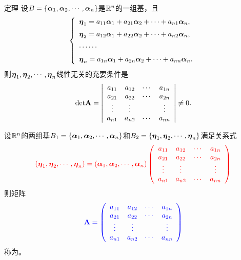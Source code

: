 \begin{frame}
  \begin{footnotesize}
    \begin{block}{定理}
      设$B=\{\boldsymbol{\alpha}_1,\boldsymbol{\alpha}_2,\cdots,\boldsymbol{\alpha}_n\}$是$\mathbb{R}^n$的一组基，且
      $$
      \left\{
      \begin{array}{l}
        \boldsymbol{\eta}_1=a_{11}\boldsymbol{\alpha}_1+a_{21}\boldsymbol{\alpha}_2+\cdots+a_{n1}\boldsymbol{\alpha}_n,\\[0.2cm]
        \boldsymbol{\eta}_2=a_{12}\boldsymbol{\alpha}_1+a_{22}\boldsymbol{\alpha}_2+\cdots+a_{n2}\boldsymbol{\alpha}_n,\\[0.2cm]
        \cdots\cdots\\[0.2cm]
        \boldsymbol{\eta}_n=a_{1n}\boldsymbol{\alpha}_1+a_{2n}\boldsymbol{\alpha}_2+\cdots+a_{nn}\boldsymbol{\alpha}_n.
      \end{array}
      \right.
      $$
      则$\boldsymbol{\eta}_1,\boldsymbol{\eta}_2,\cdots,\boldsymbol{\eta}_n$线性无关的充要条件是
      $$
      \mathrm{det}\mathbf{A}=\left|
      \begin{array}{cccc}
        a_{11}&a_{12}&\cdots&a_{1n}\\
        a_{21}&a_{22}&\cdots&a_{2n}\\
        \vdots&\vdots&&\vdots\\
        a_{n1}&a_{n2}&\cdots&a_{nn}
      \end{array}
      \right|\ne 0.
      $$
    \end{block}
  \end{footnotesize}
\end{frame}


\begin{frame}
  \begin{footnotesize}
    设$\mathbb{R}^n$的两组基$B_1=\{\boldsymbol{\alpha}_1,\boldsymbol{\alpha}_2,\cdots,\boldsymbol{\alpha}_n\}$和$B_2=\{\boldsymbol{\eta}_1,\boldsymbol{\eta}_2,\cdots,\boldsymbol{\eta}_n\}$满足关系式
    $$\textcolor{red}{
    (\boldsymbol{\eta}_1,\boldsymbol{\eta}_2,\cdots,\boldsymbol{\eta}_n)=(\boldsymbol{\alpha}_1,\boldsymbol{\alpha}_2,\cdots,\boldsymbol{\alpha}_n)\left(
    \begin{array}{cccc}
      a_{11}&a_{12}&\cdots&a_{1n}\\
      a_{21}&a_{22}&\cdots&a_{2n}\\
      \vdots&\vdots&&\vdots\\
      a_{n1}&a_{n2}&\cdots&a_{nn}
    \end{array}
    \right)}
    $$
    则矩阵
    $$\textcolor{blue}{
    \mathbf{A}=\left(
    \begin{array}{cccc}
      a_{11}&a_{12}&\cdots&a_{1n}\\
      a_{21}&a_{22}&\cdots&a_{2n}\\
      \vdots&\vdots&&\vdots\\
      a_{n1}&a_{n2}&\cdots&a_{nn}
    \end{array}
    \right)}
    $$
    称为。
  \end{footnotesize}
\end{frame}

